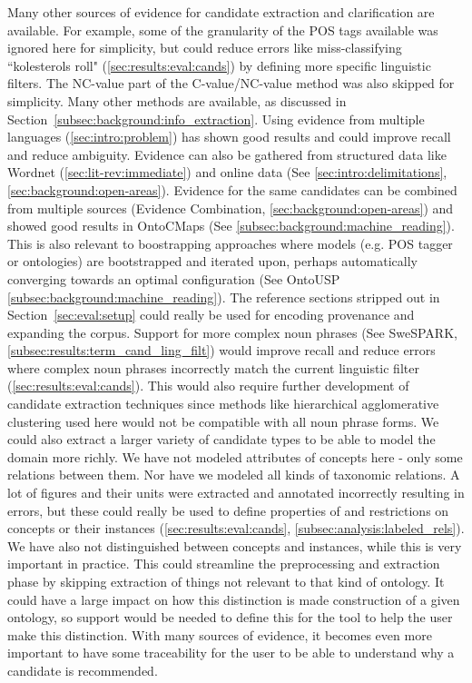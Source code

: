 \documentclass[a4paper]{report}
\begin{document}
Many other sources of evidence for candidate extraction and clarification are available.
For example, some of the granularity of the POS tags available was ignored here for simplicity, but could reduce errors like miss-classifying ``kolesterols roll" (\ref{sec:results:eval:cands}) by defining more specific linguistic filters.
The NC-value part of the C-value/NC-value method was also skipped for simplicity.
Many other methods are available, as discussed in Section~\ref{subsec:background:info_extraction}.
Using evidence from multiple languages (\ref{sec:intro:problem}) has shown good results and could improve recall and reduce ambiguity.
Evidence can also be gathered from structured data like Wordnet (\ref{sec:lit-rev:immediate}) and online data (See \ref{sec:intro:delimitations}, \ref{sec:background:open-areas}).
Evidence for the same candidates can be combined from multiple sources (Evidence Combination, \ref{sec:background:open-areas}) and showed good results in OntoCMaps (See \ref{subsec:background:machine_reading}).
This is also relevant to boostrapping approaches where models (e.g. POS tagger or ontologies) are bootstrapped and iterated upon, perhaps automatically converging towards an optimal configuration  (See OntoUSP \ref{subsec:background:machine_reading}).
The reference sections stripped out in Section~\ref{sec:eval:setup} could really be used for encoding provenance and expanding the corpus.
Support for more complex noun phrases (See SweSPARK, \ref{subsec:results:term_cand_ling_filt}) would improve recall and reduce errors where complex noun phrases incorrectly match the current linguistic filter (\ref{sec:results:eval:cands}).
This would also require further development of candidate extraction techniques since methods like hierarchical agglomerative clustering used here would not be compatible with all noun phrase forms.
We could also extract a larger variety of candidate types to be able to model the domain more richly.
We have not modeled attributes of concepts here - only some relations between them.
Nor have we modeled all kinds of taxonomic relations.
A lot of figures and their units were extracted and annotated incorrectly resulting in errors, but these could really be used to define properties of and restrictions on concepts or their instances (\ref{sec:results:eval:cands}, \ref{subsec:analysis:labeled_rels}).
We have also not distinguished between concepts and instances, while this is very important in practice.
This could streamline the preprocessing and extraction phase by skipping extraction of things not relevant to that kind of ontology.
It could have a large impact on how this distinction is made construction of a given ontology, so support would be needed to define this for the tool to help the user make this distinction.
With many sources of evidence, it becomes even more important to have some traceability for the user to be able to understand why a candidate is recommended.
\end{document}
